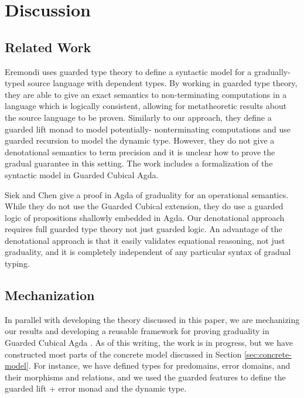 \section{Discussion}

\subsection{Related Work}
Eremondi \cite{Eremondi_2023} uses guarded type theory to
define a syntactic model for a gradually-typed source
language with dependent types. By working in guarded type theory, they are
able to give an exact semantics to non-terminating computations in a language
which is logically consistent, allowing for metatheoretic results about the
source language to be proven.
%
Similarly to our approach, they define a guarded lift monad to model potentially-
nonterminating computations and use guarded recursion to model the dynamic type.
However, they do not give a denotational semantics to term precision and it is unclear
how to prove the gradual guarantee in this setting.
The work includes a formalization of the syntactic model in Guarded Cubical Agda.

Siek and Chen \cite{siek-chen2021} give a proof in Agda of graduality
for an operational semantics. While they do not use the Guarded
Cubical extension, they do use a guarded logic of propositions
shallowly embedded in Agda. Our denotational approach requires full
guarded type theory not just guarded logic. An advantage of the
denotational approach is that it easily validates equational
reasoning, not just graduality, and it is completely independent of
any particular syntax of gradual typing.

\subsection{Mechanization}
In parallel with developing the theory discussed in this paper,
we are mechanizing our results and developing a reusable framework
for proving graduality in Guarded Cubical Agda \cite{veltri-vezzosi2020}.
%
As of this writing, the work is in progress, but we have
constructed most parts of the concrete model discussed in
Section \ref{sec:concrete-model}. For instance, we have defined
types for predomains, error domains, and their morphisms and relations,
and we used the guarded features to define the guarded lift + error monad
and the dynamic type.

